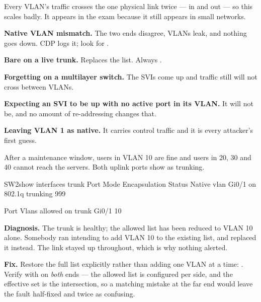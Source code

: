 Every VLAN's traffic crosses the one physical link twice --- in and out --- so
this scales badly. It appears in the exam because it still appears in small
networks.

\begin{pitfall}
\begin{tight}
  \item \textbf{Native VLAN mismatch.} The two ends disagree, VLANs leak, and
        nothing goes down. CDP logs it; look for
        .
  \item \textbf{Bare  on a live trunk.} Replaces the list.
        Always .
  \item \textbf{Forgetting  on a multilayer switch.} The SVIs
        come up and traffic still will not cross between VLANs.
  \item \textbf{Expecting an SVI to be up with no active port in its VLAN.} It
        will not be, and no amount of re-addressing changes that.
  \item \textbf{Leaving VLAN 1 as native.} It carries control traffic and it is
        every attacker's first guess.
\end{tight}
\end{pitfall}

\begin{breakfix}
After a maintenance window, users in VLAN 10 are fine and users in 20, 30 and 40
cannot reach the servers. Both uplink ports show as trunking.

\begin{verify}{SW2}{show interfaces trunk}
Port        Mode         Encapsulation  Status        Native vlan
Gi0/1       on           802.1q         trunking      999

Port        Vlans allowed on trunk
Gi0/1       10
\end{verify}

\textbf{Diagnosis.} The trunk is healthy; the allowed list has been reduced to
VLAN 10 alone. Somebody ran  intending to
add VLAN 10 to the existing list, and replaced it instead. The link stayed up
throughout, which is why nothing alerted.

\textbf{Fix.} Restore the full list explicitly rather than adding one VLAN at a
time: . Verify with
 on \emph{both} ends --- the allowed list is
configured per side, and the effective set is the intersection, so a matching
mistake at the far end would leave the fault half-fixed and twice as confusing.
\end{breakfix}

